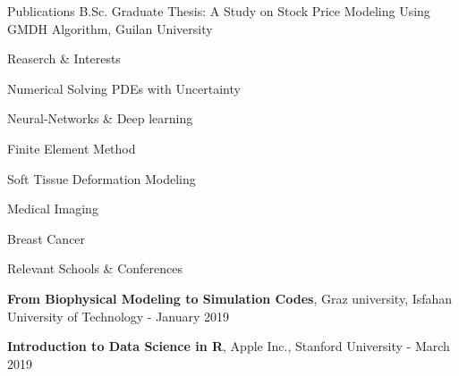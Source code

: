 \documentclass{resume} %
\begin{document}
\begin{rSection}{Publications}
	 B.Sc. Graduate Thesis: A Study on Stock Price Modeling Using GMDH Algorithm, Guilan University\\	
\end{rSection}
\begin{rSection}{Reaserch \& Interests}	
	\begin{rSubsection}{}{}{}{}
		\item Numerical Solving PDEs with Uncertainty
		\item Neural-Networks \& Deep learning
		\item Finite Element Method
		\item Soft Tissue Deformation Modeling
		\item Medical Imaging
		\item Breast Cancer
	\end{rSubsection}	
\end{rSection}
\begin{rSection}{Relevant Schools \& Conferences}	
	\begin{rSubsection}{}{}{}{}
		\item \textbf{From Biophysical Modeling to Simulation Codes}, Graz university, Isfahan University of Technology - January 2019
		
		\item \textbf{Introduction to Data Science in R}, Apple Inc., Stanford University - March 2019
	\end{rSubsection}
\end{rSection}
\end{document}
